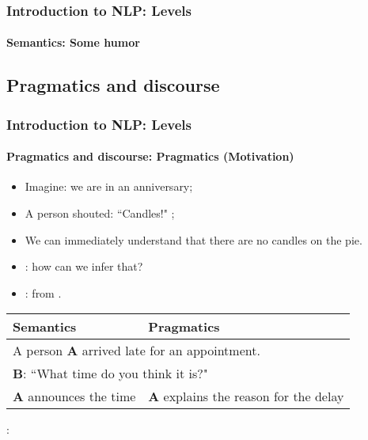 \documentclass[xcolor=table]{beamer}
\begin{document}
\begin{frame}
\frametitle{Introduction to NLP: Levels}
\framesubtitle{Semantics: Some humor}

\begin{center}
\end{center}

\end{frame}

\subsection{Pragmatics and discourse}

\begin{frame}
\frametitle{Introduction to NLP: Levels}
\framesubtitle{Pragmatics and discourse: Pragmatics (Motivation)}

\begin{minipage}{0.7\textwidth}
\begin{itemize}
	\item Imagine: we are in an anniversary;
	\item A person shouted: ``Candles!" ;
	\item We can immediately understand that there are no candles on the pie.
	\item {}: how can we infer that?
	\item {}: from .
\end{itemize}
\end{minipage}
\begin{minipage}{0.28\textwidth}
\end{minipage}

\vfill
\begin{tabular}{|p{}|p{}|}
	\hline
	\bfseries Semantics & \bfseries Pragmatics \\
	\hline 
	\multicolumn{2}{|l|}{A person \textbf{A} arrived late for an appointment.} \\
	\multicolumn{2}{|l|}{\textbf{B}: ``What time do you think it is?"} \\
	\hline 
	\textbf{A} announces the time &  \textbf{A} explains the reason for the delay \\
	\hline
\end{tabular}

\vfill 

: 

\end{frame}
\end{document}
